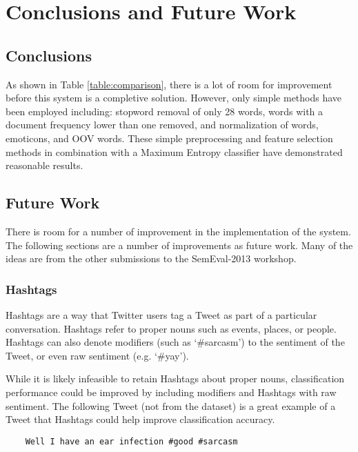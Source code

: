 \documentclass[final,3p,12pt]{elsarticle}
\begin{document}
\section{Conclusions and Future Work}
\label{section:conclusionsandfuturework}

\subsection{Conclusions}
\label{ssection:conclusions}

As shown in Table \ref{table:comparison}, there is a lot of room for improvement
before this system is a completive solution. However, only simple methods have
been employed including: stopword removal of only 28 words, words with a
document frequency lower than one removed, and normalization of words, emoticons,
and OOV words. These simple preprocessing and feature selection methods in
combination with a Maximum Entropy classifier have demonstrated reasonable
results.

\subsection{Future Work}
\label{ssection:futurework}

There is room for a number of improvement in the implementation of the system.
The following sections are a number of improvements as future work. Many of the
ideas are from the other submissions to the SemEval-2013 workshop.

\subsubsection{Hashtags}
\label{sssection:hashtags}

Hashtags are a way that Twitter users tag a Tweet as part of a particular
conversation. Hashtags refer to proper nouns such as events, places, or people.
Hashtags can also denote modifiers (such as `\#sarcasm') to the sentiment of the
Tweet, or even raw sentiment (e.g. `\#yay').

While it is likely infeasible to retain Hashtags about proper nouns,
classification performance could be improved by including modifiers and
Hashtags with raw sentiment. The following Tweet (not from the dataset) is a
great example of a Tweet that Hashtags could help improve classification
accuracy.

\begin{verbatim}
    Well I have an ear infection #good #sarcasm
\end{verbatim}
\end{document}
